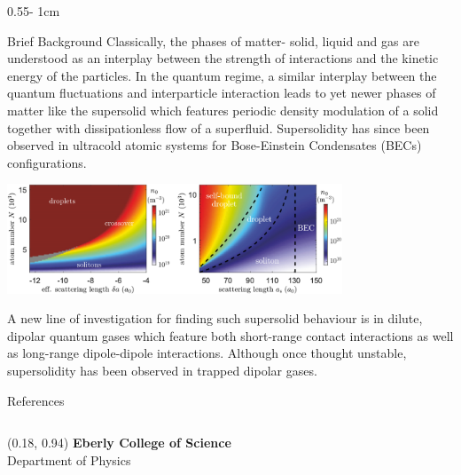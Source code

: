 \documentclass{../psuposter}
\begin{document}
\begin{frame}
\begin{columns}[t, totalwidth=\textwidth]
\begin{column}{0.55\textwidth - 1cm}
    \begin{block}{Brief Background}
    Classically, the phases of matter- solid, liquid and gas are understood as an interplay between the strength of interactions and the kinetic energy of the particles. In the quantum regime, a similar interplay between the quantum fluctuations and interparticle interaction leads to yet newer phases of matter like the supersolid which features periodic density modulation of a solid together with dissipationless flow of a superfluid.  Supersolidity has since been observed in ultracold atomic systems for Bose-Einstein Condensates (BECs) configurations. \cite{lahayePhysicsDipolarBosonic2009a} 
        \begin{center}
		   	\includegraphics[width=0.75\textwidth]{images/droplet}    		
    	\end{center}
		 A new line of investigation for finding such supersolid behaviour is in dilute, dipolar quantum gases which feature both short-range contact interactions as well as long-range dipole-dipole interactions. Although once thought unstable, supersolidity has been observed in trapped dipolar gases. \cite{bottcherNewStatesMatter2020} 

    \end{block}


    \begin{block}{References}
        
%        
		
    \end{block}

\end{column}
\end{columns}


\begin{textblock}{0.5}(0.18, 0.94)
    \color{white}
    \sffamily
    \textbf{Eberly College of Science}
    \\
    Department of Physics
\end{textblock}


\end{frame}
\end{document}
